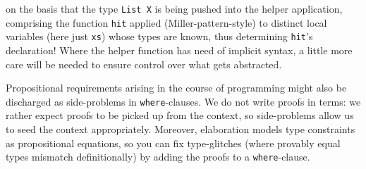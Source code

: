 \documentclass{article}
\begin{document}
on the basis that the type \texttt{List X} is being pushed into
the helper application, comprising the function \texttt{hit} applied
(Miller-pattern-style) to distinct local variables (here just \texttt{xs})
whose types are known, thus determining \texttt{hit}'s declaration!
Where the helper function has need of implicit syntax, a little more
care will be needed to ensure control over what gets abstracted.

Propositional requirements arising in the course of programming might
also be discharged as side-problems in \texttt{where}-clauses. We do not
write proofs in terms: we rather expect proofs to be picked up from the
context, so side-problems allow us to seed the context appropriately.
Moreover, elaboration models type constraints as propositional equations,
so you can fix type-glitches (where provably equal types mismatch
definitionally) by adding the proofs to a \texttt{where}-clause.
\end{document}
